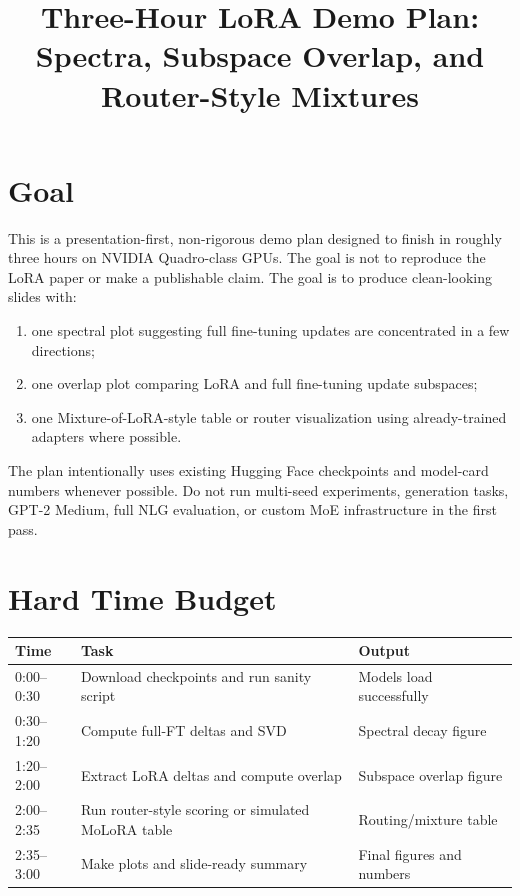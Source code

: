\documentclass[11pt]{article}
\title{Three-Hour LoRA Demo Plan: Spectra, Subspace Overlap, and Router-Style Mixtures}
\author{}
\date{}
\begin{document}
\maketitle

\section{Goal}

This is a presentation-first, non-rigorous demo plan designed to finish in roughly three hours on NVIDIA Quadro-class GPUs. The goal is not to reproduce the LoRA paper or make a publishable claim. The goal is to produce clean-looking slides with:
\begin{enumerate}
    \item one spectral plot suggesting full fine-tuning updates are concentrated in a few directions;
    \item one overlap plot comparing LoRA and full fine-tuning update subspaces;
    \item one Mixture-of-LoRA-style table or router visualization using already-trained adapters where possible.
\end{enumerate}

The plan intentionally uses existing Hugging Face checkpoints and model-card numbers whenever possible. Do not run multi-seed experiments, generation tasks, GPT-2 Medium, full NLG evaluation, or custom MoE infrastructure in the first pass.

\section{Hard Time Budget}

\begin{center}
\begin{tabular}{@{}lll@{}}
\toprule
Time & Task & Output \\
\midrule
0:00--0:30 & Download checkpoints and run sanity script & Models load successfully \\
0:30--1:20 & Compute full-FT deltas and SVD & Spectral decay figure \\
1:20--2:00 & Extract LoRA deltas and compute overlap & Subspace overlap figure \\
2:00--2:35 & Run router-style scoring or simulated MoLoRA table & Routing/mixture table \\
2:35--3:00 & Make plots and slide-ready summary & Final figures and numbers \\
\bottomrule
\end{tabular}
\end{center}
\end{document}
